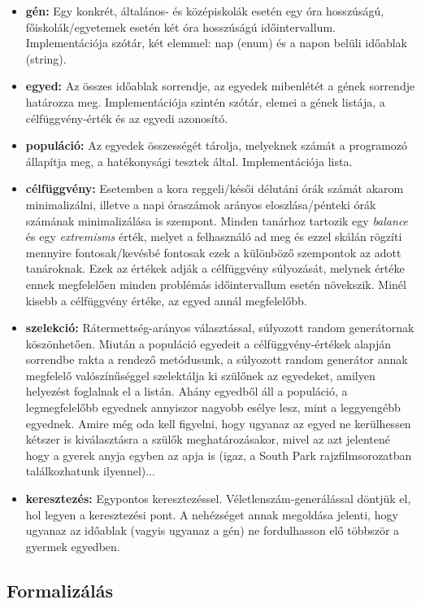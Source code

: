 \documentclass[12pt,a4paper]{report}
\begin{document}
\begin{itemize}
    \item \textbf{gén:} Egy konkrét, általános- és középiskolák esetén egy óra hosszúságú, 	          főiskolák/egyetemek esetén két óra hosszúságú időintervallum. Implementációja szótár, két elemmel: nap (enum) és a napon belüli időablak (string).
    \item \textbf{egyed:} Az összes időablak sorrendje, az egyedek mibenlétét a gének sorrendje határozza meg. Implementációja szintén szótár, elemei a gének listája, a célfüggvény-érték és az
egyedi azonosító.
    \item \textbf{populáció:} Az egyedek összességét tárolja, melyeknek számát a programozó állapítja meg, a hatékonysági tesztek által. Implementációja lista.
    \item \textbf{célfüggvény:} Esetemben a kora reggeli/késői délutáni órák számát akarom minimalizálni, illetve a napi óraszámok arányos eloszlása/pénteki órák számának minimalizálása is szempont. Minden tanárhoz tartozik egy \textsl{balance} és egy \textsl{extremisms} érték,
melyet a felhasználó ad meg és ezzel skálán rögzíti mennyire fontosak/kevésbé fontosak ezek a különböző szempontok az adott tanároknak. Ezek az értékek adják a célfüggvény súlyozását, melynek értéke ennek megfelelően minden problémás időintervallum esetén növekszik. Minél kisebb a célfüggvény értéke, az egyed annál megfelelőbb.
    \item \textbf{szelekció:} Rátermettség-arányos választással, súlyozott random generátornak köszönhetően. Miután a populáció egyedeit a célfüggvény-értékek alapján sorrendbe rakta a rendező metódusunk, a súlyozott random generátor annak megfelelő valószínűséggel szelektálja ki szülőnek az egyedeket, amilyen helyezést foglalnak el a listán. Ahány egyedből áll a populáció, a legmegfelelőbb egyednek annyiszor nagyobb esélye lesz, mint a leggyengébb egyednek. Amire még oda kell figyelni, hogy ugyanaz az egyed ne kerülhessen kétszer is kiválasztásra a szülők meghatározásakor, mivel az azt jelentené hogy a gyerek anyja egyben az apja is (igaz, a South Park rajzfilmsorozatban találkozhatunk ilyennel)...
    \item \textbf{keresztezés:} Egypontos keresztezéssel. Véletlenszám-generálással döntjük el, hol legyen a keresztezési pont. A nehézséget annak megoldása jelenti, hogy ugyanaz az időablak (vagyis ugyanaz a gén) ne fordulhasson elő többször a gyermek egyedben.
\end{itemize}

\subsection{Formalizálás}
\end{document}
